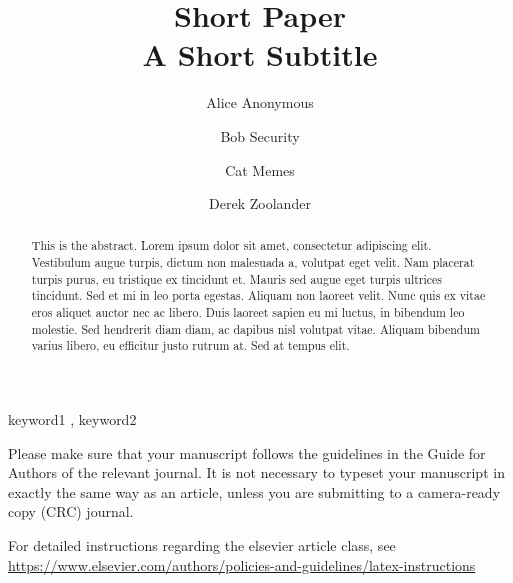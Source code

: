 \documentclass[
  authoryear,
  preprint]{elsarticle}
\begin{document}
\begin{frontmatter}
\title{Short Paper \\\large{A Short Subtitle} }
\author[1]{Alice Anonymous%
%
}
\author[2]{Bob Security%
%
}
\author[2]{Cat Memes%
%
}
\author[]{Derek Zoolander%
%
}



        
\begin{abstract}
This is the abstract. Lorem ipsum dolor sit amet, consectetur adipiscing
elit. Vestibulum augue turpis, dictum non malesuada a, volutpat eget
velit. Nam placerat turpis purus, eu tristique ex tincidunt et. Mauris
sed augue eget turpis ultrices tincidunt. Sed et mi in leo porta
egestas. Aliquam non laoreet velit. Nunc quis ex vitae eros aliquet
auctor nec ac libero. Duis laoreet sapien eu mi luctus, in bibendum leo
molestie. Sed hendrerit diam diam, ac dapibus nisl volutpat vitae.
Aliquam bibendum varius libero, eu efficitur justo rutrum at. Sed at
tempus elit.
\end{abstract}





\begin{keyword}
    keyword1 \sep 
    keyword2
\end{keyword}
\end{frontmatter}
    

Please make sure that your manuscript follows the guidelines in the
Guide for Authors of the relevant journal. It is not necessary to
typeset your manuscript in exactly the same way as an article, unless
you are submitting to a camera-ready copy (CRC) journal.

For detailed instructions regarding the elsevier article class, see
\url{https://www.elsevier.com/authors/policies-and-guidelines/latex-instructions}
\end{document}
